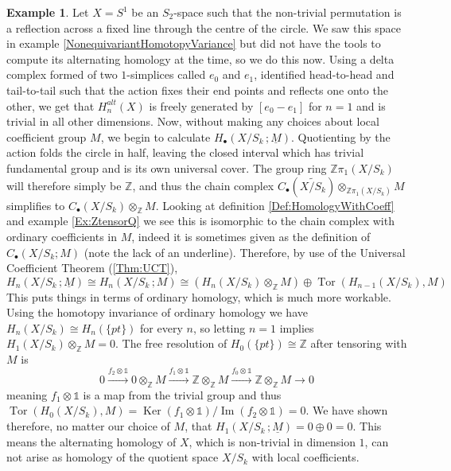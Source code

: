 \documentclass[11pt,a4paper,twoside]{article}
\theoremstyle{plain}
\theoremstyle{definition}
\theoremstyle{definition}
\theoremstyle{definition}
\theoremstyle{definition}
\newtheorem{example}[thm]{Example}
\theoremstyle{definition}
\DeclareMathOperator{\Ima}{Im}
\DeclareMathOperator{\Ker}{Ker}
\DeclareMathOperator{\Tor}{Tor}
\begin{document}
\vspace{2mm}
\begin{example}
Let $X=S^1$ be an $S_2$-space such that the non-trivial permutation is a reflection across a fixed line through the centre of the circle. We saw this space in example \ref{NonequivariantHomotopyVariance} but did not have the tools to compute its alternating homology at the time, so we do this now. Using a delta complex formed of two $1$-simplices called $e_0$ and $e_1$, identified head-to-head and tail-to-tail such that the action fixes their end points and reflects one onto the other, we get that $H^{alt}_n(X)$ is freely generated by $[e_0-e_1]$ for $n\!=\!1$ and is trivial in all other dimensions. Now, without making any choices about local coefficient group $M$, we begin to calculate $H_\bullet(X/S_k\,;\underline{M})$. Quotienting by the action folds the circle in half, leaving the closed interval which has trivial fundamental group and is its own universal cover. The group ring $\mathbb{Z}\pi_1(X/S_k)$ will therefore simply be $\mathbb{Z}$, and thus the chain complex $C_\bullet(\widetilde{X/S_k})\otimes_{\mathbb{Z}\pi_1(X/S_k)}M$ simplifies to $C_\bullet(X/S_k)\otimes_\mathbb{Z}M$. Looking at definition \ref{Def:HomologyWithCoeff} and example \ref{Ex:ZtensorQ} we see this is isomorphic to the chain complex with ordinary coefficients in $M$, indeed it is sometimes given as the definition of $C_\bullet(X/S_k;M)$ (note the lack of an underline). Therefore, by use of the Universal Coefficient Theorem (\ref{Thm:UCT}),
$$H_n(X/S_k\,;\underline{M})\cong H_n(X/S_k\,;M)\cong (H_n(X/S_k)\otimes_\mathbb{Z}M)\oplus\Tor(H_{n\!-\!1}(X/S_k),M)$$
This puts things in terms of ordinary homology, which is much more workable. Using the homotopy invariance of ordinary homology we have $H_n(X/S_k)\cong H_n(\{pt\})$ for every $n$, so letting $n=1$ implies $H_1(X/S_k)\otimes_\mathbb{Z}M=0$. The free resolution of $H_0(\{pt\})\cong\mathbb{Z}$ after tensoring with $M$ is
$$ 0\xrightarrow{f_2\otimes\mathbb{1}} 0\otimes_\mathbb{Z}M\xrightarrow{f_1\otimes\mathbb1}\mathbb{Z}\otimes_\mathbb{Z}M\xrightarrow{f_0\otimes\mathbb1}\mathbb{Z}\otimes_\mathbb{Z}M\longrightarrow0$$
meaning $f_1\otimes\mathbb1$ is a map from the trivial group and thus $\Tor(H_0(X/S_k),M)=\Ker(f_1\otimes \mathbb1)/\Ima(f_2\otimes \mathbb1)=0$. We have shown therefore, no matter our choice of $M$, that $H_1(X/S_k\,;\underline{M})=0\oplus0=0$. This means the alternating homology of $X$, which is non-trivial in dimension $1$, can not arise as homology of the quotient space $X/S_k$ with local coefficients.
\end{example}
\end{document}
